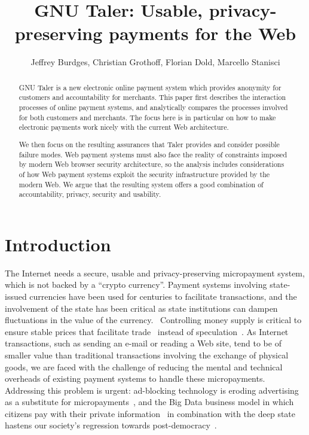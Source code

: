 \documentclass{llncs}
\date{}
\begin{document}
\title{GNU Taler: Usable, privacy-preserving payments for the Web}


\author{Jeffrey Burdges,
Christian Grothoff,
Florian Dold,
Marcello Stanisci}

\maketitle

\begin{abstract}
GNU Taler is a new electronic online payment system which provides
anonymity for customers and accountability for merchants.  This paper
first describes the interaction processes of online payment systems,
and analytically compares the processes involved for both customers
and merchants.  The focus here is in particular on how to make
electronic payments work nicely with the current Web architecture.

We then focus on the resulting assurances that Taler provides and
consider possible failure modes.  Web payment systems must also face
the reality of constraints imposed by modern Web browser security
architecture, so the analysis includes considerations of how Web
payment systems exploit the security infrastructure provided by the
modern Web.  We argue that the resulting system offers a good
combination of accountability, privacy, security and usability.
\end{abstract}

\section{Introduction}

The Internet needs a secure, usable and privacy-preserving
micropayment system, which is not backed by a ``crypto currency''.
Payment systems involving state-issued currencies have been used for
centuries to facilitate transactions, and the involvement of the state
has been critical as state institutions can dampen fluctuations in the
value of the currency.~\cite{dominguez1993} Controlling money supply
is critical to ensure stable prices that facilitate
trade~\cite{quantitytheory1997volckart} instead of speculation~\cite{lewis_btc_is_junk}.
As Internet transactions, such as sending an e-mail or reading
a Web site, tend to be of smaller value than traditional transactions
involving the exchange of physical goods, we are faced with the
challenge of reducing the mental and technical overheads of existing
payment systems to handle these micropayments.  Addressing this problem is
urgent: ad-blocking technology is eroding advertising as a substitute
for micropayments~\cite{adblockblocks}, and the Big Data business
model in which citizens pay with their private
information~\cite{ehrenberg2014data} in combination with the deep
state hastens our society's regression towards
post-democracy~\cite{rms2013democracy}.
\end{document}
